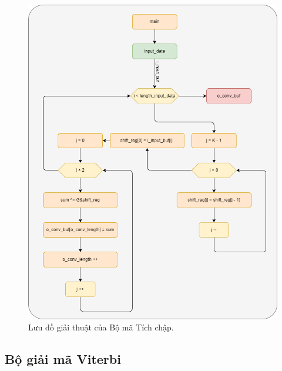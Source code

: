 \begin{figure}[H]
	\centering
	\includegraphics[width=.8\linewidth]{sections/pic/mophongbangC/flowchart_conv_block_withC.png}
	\caption{Lưu đồ giải thuật của Bộ mã Tích chập.}
\end{figure}

\subsection{Bộ giải mã Viterbi}

